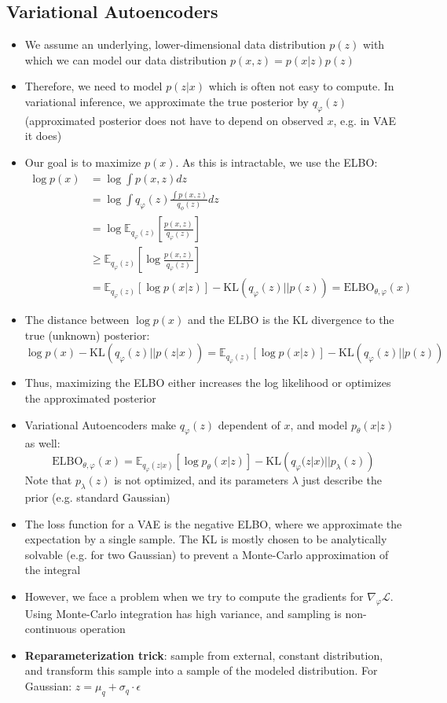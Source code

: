 \subsection{Variational Autoencoders}
\begin{itemize}
	\item We assume an underlying, lower-dimensional data distribution $p(z)$ with which we can model our data distribution $p(x,z)=p(x|z)p(z)$
	\item Therefore, we need to model $p(z|x)$ which is often not easy to compute. In variational inference, we approximate the true posterior by $q_{\varphi}(z)$ (approximated posterior does not have to depend on observed $x$, e.g. in VAE it does)
	\item Our goal is to maximize $p(x)$. As this is intractable, we use the ELBO:
	\begin{equation*}
		\begin{split}
			\log p(x) & = \log \int p(x,z)dz \\
			& = \log \int q_{\varphi}(z) \frac{\int p(x,z)}{q_{\phi}(z)} dz\\
			& = \log \mathbb{E}_{q_{\varphi}(z)}\left[\frac{p(x,z)}{q_{\varphi}(z)}\right]\\
			& \geq \mathbb{E}_{q_{\varphi}(z)}\left[\log \frac{p(x,z)}{q_{\varphi}(z)}\right]\\
			& = \mathbb{E}_{q_{\varphi}(z)}\left[\log p(x|z)\right] - \text{KL}\left(q_{\varphi}(z)||p(z)\right) = \text{ELBO}_{\theta, \varphi}\left(x\right)
		\end{split}
	\end{equation*}
	\item The distance between $\log p(x)$ and the ELBO is the KL divergence to the true (unknown) posterior:
	$$\log p(x) - \text{KL}\left(q_{\varphi}(z)||p(z|x)\right) = \mathbb{E}_{q_{\varphi}(z)}\left[\log p(x|z)\right] - \text{KL}\left(q_{\varphi}(z)||p(z)\right)$$
	\item Thus, maximizing the ELBO either increases the log likelihood or optimizes the approximated posterior
	\item Variational Autoencoders make $q_{\varphi}(z)$ dependent of $x$, and model $p_{\theta}(x|z)$ as well:
	$$\text{ELBO}_{\theta, \varphi}\left(x\right) = \mathbb{E}_{q_{\varphi}(z|x)}\left[\log p_{\theta}(x|z)\right] - \text{KL}\left(q_{\varphi}(z|x)||p_{\lambda}(z)\right)$$
	Note that $p_{\lambda}(z)$ is not optimized, and its parameters $\lambda$ just describe the prior (e.g. standard Gaussian) 
	\item The loss function for a VAE is the negative ELBO, where we approximate the expectation by a single sample. The KL is mostly chosen to be analytically solvable (e.g. for two Gaussian) to prevent a Monte-Carlo approximation of the integral 
	\item However, we face a problem when we try to compute the gradients for $\nabla_{\varphi} \mathcal{L}$. Using Monte-Carlo integration has high variance, and sampling is non-continuous operation
	\item \textbf{Reparameterization trick}: sample from external, constant distribution, and transform this sample into a sample of the modeled distribution. For Gaussian: $z = \mu_q + \sigma_q \cdot \epsilon$
\end{itemize}

